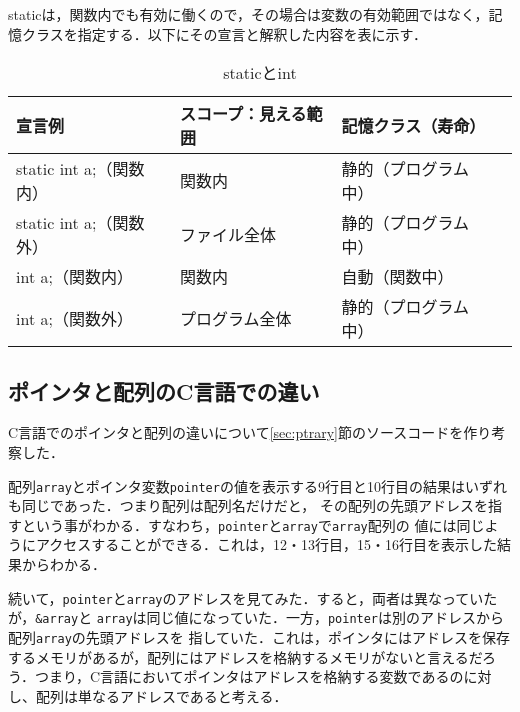 \documentclass[a4j,11pt]{jarticle}
\begin{document}
staticは，関数内でも有効に働くので，その場合は変数の有効範囲ではなく，記憶クラスを指定する．以下にその宣言と解釈した内容を表に示す．
\begin{table}[htb]
  \label{tab:table1}
  \centering
  \begin{tabular}{|l|l|l|l|}
  \hline
  宣言例                & スコープ：見える範囲 & 記憶クラス（寿命）  \\ \hline
  static int a;（関数内） & 関数内        & 静的（プログラム中） \\ \hline
  static int a;（関数外） & ファイル全体     & 静的（プログラム中） \\ \hline
  int a;（関数内）        & 関数内        & 自動（関数中）    \\ \hline
  int a;（関数外）        & プログラム全体    & 静的（プログラム中） \\ \hline
  \end{tabular}
  \caption{staticとint}
  \end{table}

\subsection{ポインタと配列のC言語での違い}
C言語でのポインタと配列の違いについて\ref{sec:ptrary}節のソースコードを作り考察した．

配列\verb|array|とポインタ変数\verb|pointer|の値を表示する9行目と10行目の結果はいずれも同じであった．つまり配列は配列名だけだと，
その配列の先頭アドレスを指すという事がわかる．すなわち，\verb|pointer|と\verb|array|で\verb|array|配列の
値には同じようにアクセスすることができる．これは，12・13行目，15・16行目を表示した結果からわかる．

続いて，\verb|pointer|と\verb|array|のアドレスを見てみた．すると，両者は異なっていたが，\verb|&array|と
\verb|array|は同じ値になっていた．一方，\verb|pointer|は別のアドレスから配列\verb|array|の先頭アドレスを
指していた．これは，ポインタにはアドレスを保存するメモリがあるが，配列にはアドレスを格納するメモリがないと言えるだろう．つまり，C言語においてポインタはアドレスを格納する変数であるのに対し、配列は単なるアドレスであると考える．
\end{document}
